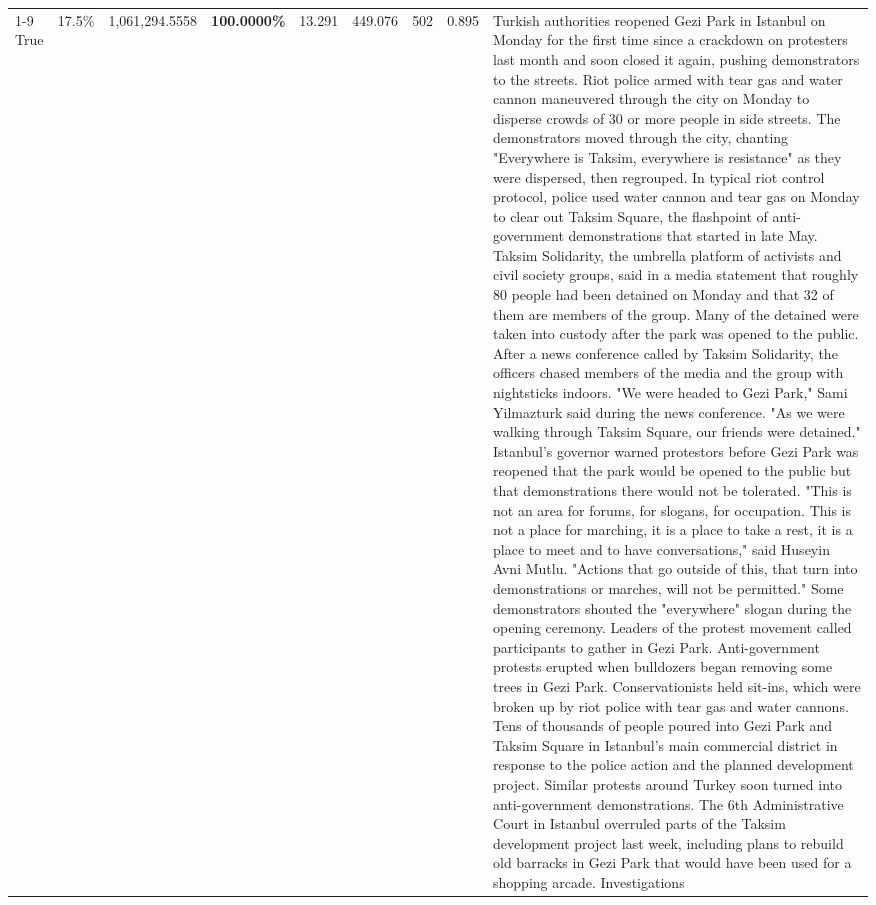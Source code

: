 \begin{table}[H]
\begin{tabular}{lllrlllll}
\cline{1-9}
True & 17.5\% & 1,061,294.5558 & \bfseries \color{red} 100.0000\% & 13.291 & 449.076 & 502 & 0.895 & Turkish authorities reopened Gezi Park in Istanbul on Monday for the first time since a crackdown on protesters last month and soon closed it again, pushing demonstrators to the streets. Riot police armed with tear gas and water cannon maneuvered through the city on Monday to disperse crowds of 30 or more people in side streets. The demonstrators moved through the city, chanting "Everywhere is Taksim, everywhere is resistance" as they were dispersed, then regrouped. In typical riot control protocol, police used water cannon and tear gas on Monday to clear out Taksim Square, the flashpoint of anti-government demonstrations that started in late May. Taksim Solidarity, the umbrella platform of activists and civil society groups, said in a media statement that roughly 80 people had been detained on Monday and that 32 of them are members of the group. Many of the detained were taken into custody after the park was opened to the public. After a news conference called by Taksim Solidarity, the officers chased members of the media and the group with nightsticks indoors. "We were headed to Gezi Park," Sami Yilmazturk said during the news conference. "As we were walking through Taksim Square, our friends were detained." Istanbul's governor warned protestors before Gezi Park was reopened that the park would be opened to the public but that demonstrations there would not be tolerated. "This is not an area for forums, for slogans, for occupation. This is not a place for marching, it is a place to take a rest, it is a place to meet and to have conversations," said Huseyin Avni Mutlu. "Actions that go outside of this, that turn into demonstrations or marches, will not be permitted." Some demonstrators shouted the "everywhere" slogan during the opening ceremony. Leaders of the protest movement called participants to gather in Gezi Park. Anti-government protests erupted when bulldozers began removing some trees in Gezi Park. Conservationists held sit-ins, which were broken up by riot police with tear gas and water cannons. Tens of thousands of people poured into Gezi Park and Taksim Square in Istanbul's main commercial district in response to the police action and the planned development project. Similar protests around Turkey soon turned into anti-government demonstrations. The 6th Administrative Court in Istanbul overruled parts of the Taksim development project last week, including plans to rebuild old barracks in Gezi Park that would have been used for a shopping arcade. Investigations \\

\end{tabular}
\end{table}
